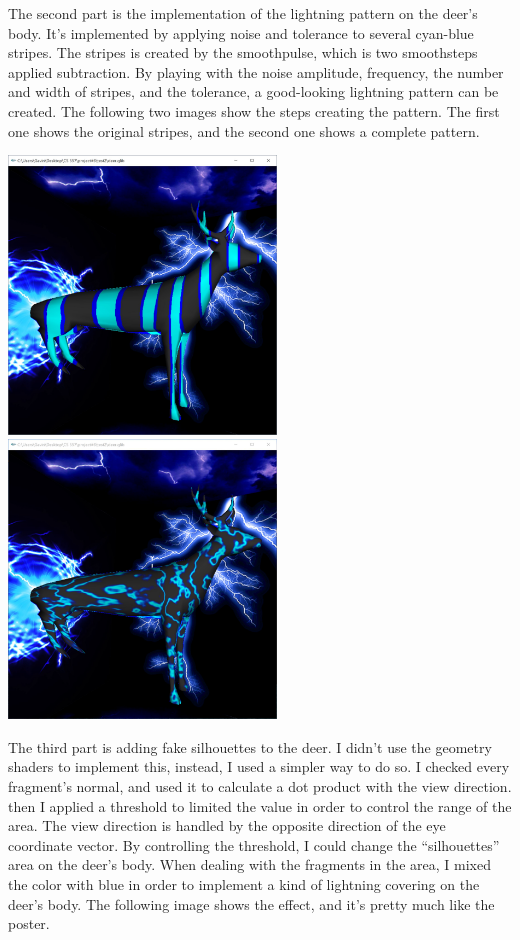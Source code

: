 \documentclass[letterpaper,14pt,titlepage,fleqn]{article}
\begin{document}
The second part is the implementation of the lightning pattern on the deer's body. It's implemented by applying noise and tolerance to several cyan-blue stripes. The stripes is created by the smoothpulse, which is two smoothsteps applied subtraction. By playing with the noise amplitude, frequency, the number and width of stripes, and the tolerance, a good-looking lightning pattern can be created. The following two images show the steps creating the pattern. The first one shows the original stripes, and the second one shows a complete pattern.
 \begin{center}
 	\includegraphics[width=2.8in]{strip.jpg}
 	\includegraphics[width=2.8in]{noise.jpg}
 \end{center}
 The third part is adding fake silhouettes to the deer. I didn't use the geometry shaders to implement this, instead, I used a simpler way to do so. I checked every fragment's normal, and used it to calculate a dot product with the view direction. then I applied a threshold to limited the value in order to control the range of the area. The view direction is handled by the opposite direction of the eye coordinate vector. By controlling the threshold, I could change the ``silhouettes'' area on the deer's body. When dealing with the fragments in the area, I mixed the color with blue in order to implement a kind of lightning covering on the deer's body. The following image shows the effect, and it's pretty much like the poster.
\end{document}
